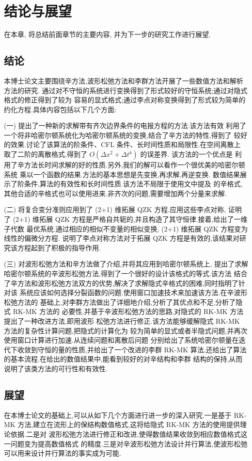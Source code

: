 \chapter{结论与展望}
在本章, 将总结前面章节的主要内容, 并为下一步的研究工作进行展望.
\section{结论}
本博士论文主要围绕辛方法,波形松弛方法和李群方法开展了一些数值方法和解析方法的研究.
通过对不守恒的系统进行变换得到了形式较好的守恒系统;通过对隐式格式的修正得到了较为
容易的显式格式;通过李点对称变换得到了形式较为简单的约化方程.具体内容包括以下几个方面:

(一) 提出了一种新的求解带有齐次边界条件的电报方程的方法.该方法有效
利用了一个将非哈密尔顿系统化为哈密尔顿系统的变换,结合了辛方法的特性,得到了
较好的效果.讨论了该算法的阶条件、CFL 条件、长时间性质和局限性.在空间离散上
取了二阶的离散格式,得到了 $O(\Delta x^2+ \Delta t^k)$ 的误差界. 该方法的一个优点是
利用了辛方法长时间求解的好的性质.另外,我们的解可以看作一个很优美的哈密尔顿系统
乘以一个函数的结果.方法的基本思想是先变换,再求解,再逆变换.
数值结果展示了阶条件,算法的有效性和长时间性质.该方法不局限于使用文中提及
的辛格式,其他合适的辛格式也可以使用进来.非齐次的问题,需要增加两个分量来求解.

(二) 将复合变分准则应用到了 (2+1) 维拓展 QZK 方程.应用这些李点对称,
证明了 (2+1) 维拓展 QZK 方程是严格自共轭的,并且构造了其守恒律.接着,给出了一维子代数
最优系统.通过相应的相似不变量的相似变换, (2+1) 维拓展 QZK 方程变为线性的偏微分方程.
说明了李点对称方法对于拓展 QZK 方程是有效的,该结果对研究该方程起到了积极的指导作用.

(三) 对波形松弛方法和辛方法做了介绍,并将其应用到哈密尔顿系统上,
提出了求解哈密尔顿系统的辛波形松弛方法,得到了一个很好的设计该格式的等式.该方法
结合了辛方法和波形松弛方法双方的优势,解决了求解隐式辛格式的困难,同时指明了针对该
系统应该如何选择分裂函数的问题.使用窗口加速技术来加速该方法.在辛波形松弛方法的
基础上,对李群方法做出了详细地介绍,分析了其优点和不足,分析了隐式 RK-MK 方法的
必要性,并基于辛波形松弛方法的思路,对隐式的 RK-MK 方法提出了一种改进方法,即用波形
松弛方法进行修正.该方法能够缓解隐式 RK-MK 方法的复杂性计算问题,把隐式的计算化为
较为简单的显式或者半隐式问题,并再次使用窗口计算进行加速.从连续问题和离散后问题
分别给出了系统哈密尔顿量在迭代下收敛到守恒的量的性质,并给出了一个改进的李群 RK-MK
算法,还给出了算法的基本流程.在给出的数值结果中,能看到较好的对辛结构和李群
结构的保持,从而说明了该类方法的可行性和有效性.

\section{展望}
在本博士论文的基础上,可以从如下几个方面进行进一步的深入研究.一是基于 RK-MK
方法,建立在流形上的保结构数值格式,这将给隐式 RK-MK 方法的使用提供理论依据.二是对
波形松弛方法进行修正和改进,使得数值结果收敛到相应数值格式这一问题变为提高数值格式
的精度.三是对辛波形松弛方法设计并行算法,使波形松弛可以用来设计并行算法的事实成为可能.
